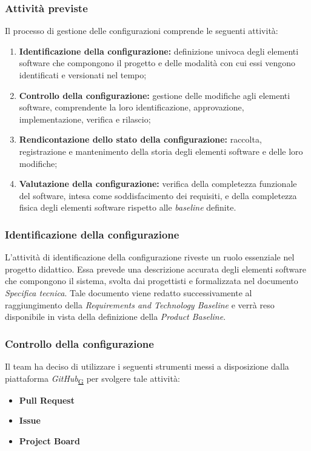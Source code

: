 \documentclass[a4paper,12pt]{article}
\begin{document}
        \subsubsection{Attività previste}
            Il processo di gestione delle configurazioni comprende le seguenti attività:
            \begin{enumerate}
                \item \textbf{Identificazione della configurazione:} definizione univoca degli elementi software che compongono il progetto e delle modalità con cui essi vengono identificati e versionati nel tempo;
                \item \textbf{Controllo della configurazione:} gestione delle modifiche agli elementi software, comprendente la loro identificazione, approvazione, implementazione, verifica e rilascio;
                \item \textbf{Rendicontazione dello stato della configurazione:} raccolta, registrazione e mantenimento della storia degli elementi software e delle loro modifiche;
                \item \textbf{Valutazione della configurazione:} verifica della completezza funzionale del software, intesa come soddisfacimento dei requisiti, e della completezza fisica degli elementi software rispetto alle \textit{baseline} definite.
            \end{enumerate}

        

        \subsubsection{Identificazione della configurazione}
            L'attività di identificazione della configurazione riveste un ruolo essenziale nel progetto didattico. Essa prevede una descrizione accurata degli elementi software che compongono il sistema, svolta dai progettisti e formalizzata nel documento \textit{Specifica tecnica}. Tale documento viene redatto successivamente al raggiungimento della \textit{Requirements and Technology Baseline} e verrà reso disponibile in vista della definizione della \textit{Product Baseline}.
        

        \subsubsection{Controllo della configurazione}
            Il team ha deciso di utilizzare i seguenti strumenti messi a disposizione dalla piattaforma \textit{GitHub}\textsubscript{\href{https://atlasteam9.github.io/Atlas/glossario.html\#GitHub}{G}} per svolgere tale attività:
            \begin{itemize}
                \item \textbf{Pull Request}
                \item \textbf{Issue}
                \item \textbf{Project Board}
            \end{itemize}
            
\end{document}
